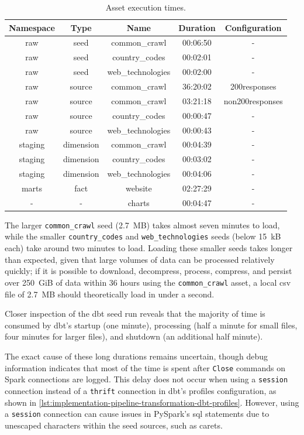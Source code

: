 \begin{table}[H]
    \centering
    \begin{tabular}{|c|c|c|c|c|}
    \hline
    \textbf{Namespace} & \textbf{Type} & \textbf{Name} & \textbf{Duration} & \textbf{Configuration} \\
    \hline
    raw & seed & common\_crawl & 00:06:50 & - \\
    raw & seed & country\_codes & 00:02:01 & - \\
    raw & seed & web\_technologies & 00:02:00 & - \\
    raw & source & common\_crawl & 36:20:02 & 200responses \\
    raw & source & common\_crawl & 03:21:18 & non200responses \\
    raw & source & country\_codes & 00:00:47 & - \\
    raw & source & web\_technologies & 00:00:43 & - \\
    staging & dimension & common\_crawl & 00:04:39 & - \\
    staging & dimension & country\_codes & 00:03:02 & - \\
    staging & dimension & web\_technologies & 00:04:06 & - \\
    marts & fact & website & 02:27:29 & - \\
    - & - & charts & 00:04:47 & - \\
    \hline
    \end{tabular}
    \caption{Asset execution times.}
    \label{tab:analysis-dataset-asset-times}
\end{table}

The larger \texttt{common\_crawl} seed (2.7~MB) takes almost seven minutes to load, while the smaller \texttt{country\_codes} and \texttt{web\_technologies} seeds (below 15~kB each) take around two minutes to load.
Loading these smaller seeds takes longer than expected, given that large volumes of data can be processed relatively quickly; if it is possible to download, decompress, process, compress, and persist over 250~GiB of data within 36 hours using the \texttt{common\_crawl} asset, a local \ac{csv} file of 2.7~MB should theoretically load in under a second.

Closer inspection of the dbt seed run reveals that the majority of time is consumed by dbt's startup (one minute), processing (half a minute for small files, four minutes for larger files), and shutdown (an additional half minute).

The exact cause of these long durations remains uncertain, though debug information indicates that most of the time is spent after \texttt{Close} commands on Spark connections are logged.
This delay does not occur when using a \texttt{session} connection instead of a \texttt{thrift} connection in dbt's profiles configuration, as shown in \cref{lst:implementation-pipeline-transformation-dbt-profiles}.
However, using a \texttt{session} connection can cause issues in PySpark's \ac{sql} statements due to unescaped characters within the seed sources, such as carets.

